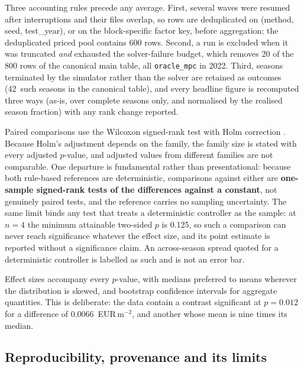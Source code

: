 Three accounting rules precede any average. First, several waves were resumed after
interruptions and their files overlap, so rows are deduplicated on
(method, seed, test\_year), or on the block-specific factor key, before
aggregation; the deduplicated priced pool contains 600 rows. Second, a run is excluded
when it was truncated \emph{and} exhausted the solver-failure budget, which removes 20 of
the 800 rows of the canonical main table, all \texttt{oracle\_mpc} in 2022. Third,
seasons terminated by the simulator rather than the solver are retained as outcomes
(42~such seasons in the canonical table), and every headline figure is recomputed three
ways (as-is, over complete seasons only, and normalised by the realised season fraction) with any rank change reported.

Paired comparisons use the Wilcoxon signed-rank test \cite{wilcoxon1945} with Holm
correction \cite{holm1979}. Because Holm's adjustment depends on the family, the family
size is stated with every adjusted $p$-value, and adjusted values from different families
are not comparable. One departure is fundamental rather than presentational: because both
rule-based references are deterministic, comparisons against either are \textbf{one-sample
signed-rank tests of the differences against a constant}, not genuinely paired tests, and
the reference carries no sampling uncertainty. The same limit binds any
test that treats a deterministic controller as the sample: at $n=4$ the minimum attainable
two-sided $p$ is 0.125, so such a comparison can never reach significance whatever the
effect size, and its point estimate is reported without a significance claim. An
across-season spread quoted for a deterministic controller is labelled as such and is not
an error bar.

Effect sizes accompany every $p$-value, with medians preferred to means wherever the
distribution is skewed, and bootstrap confidence intervals \cite{efron1994,demsar2006}
for aggregate quantities. This is deliberate: the data contain a contrast significant at
$p=0.012$ for a difference of 0.0066~EUR\,m$^{-2}$, and another whose mean is nine times its
median.

\subsection{Reproducibility, provenance and its limits}
\label{sec:repro}

